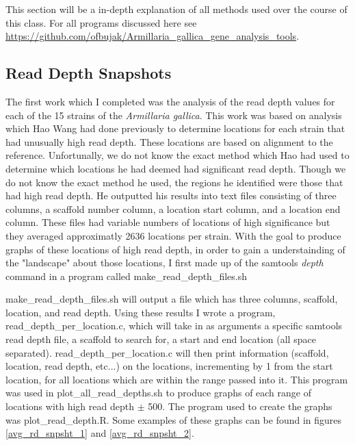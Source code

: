 \documentclass[../main.tex]{subfiles}
\begin{document}
%
%

This section will be a in-depth explanation of all methods used over the course of this class. For all programs discussed here see \url{https://github.com/ofbujak/Armillaria_gallica_gene_analysis_tools}.

\subsection{Read Depth Snapshots}%
	The first work which I completed was the analysis of the read depth values for each of the 15 strains of the \textit{Armillaria gallica}. This work was based on analysis which Hao Wang had done previously to determine locations for each strain that had unusually high read depth. These locations are based on alignment to the reference. Unfortunally, we do not know the exact method which Hao had used to determine which locations he had deemed had significant read depth. Though we do not know the exact method he used, the regions he identified were those that had high read depth. He outputted his results into text files consisting of three columns, a scaffold number column, a location start column, and a location end column. These files had variable numbers of locations of high significance but they averaged approximatly 2636 locations per strain. With the goal to produce graphs of these locations of high read depth, in order to gain a understainding of the "landscape" about those locations, I first made up of the samtools \textit{depth} command in a program called make\_read\_depth\_files.sh

make\_read\_depth\_files.sh will output a file which has three columns, scaffold, location, and read depth. Using these results I wrote a program, read\_depth\_per\_location.c, which will take in as arguments a specific samtools read depth file, a scaffold to search for, a start and end location (all space separated). read\_depth\_per\_location.c will then print information (scaffold, location, read depth, etc...) on the locations, incrementing by 1 from the start location, for all locations which are within the range passed into it. This program was used in plot\_all\_read\_depths.sh to produce graphs of each range of locations with high read depth $\pm$ 500. The program used to create the graphs was plot\_read\_depth.R. Some examples of these graphs can be found in figures \ref{avg_rd_snpsht_1} and \ref{avg_rd_snpsht_2}.
	
\end{document}
